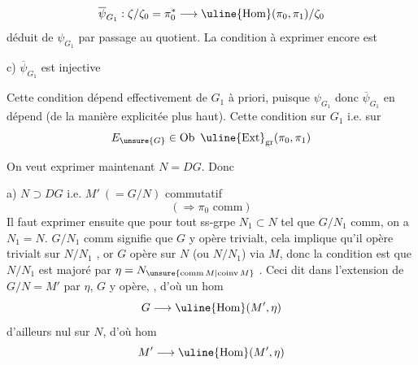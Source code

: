 \[
\overline\psi_{G_1}:\zeta/\zeta_0=\pi_0^*\longrightarrow\uline{\operatorname{Hom}}(\pi_0,\pi_1)/\zeta_0
\]
déduit de $\psi_{G_1}$ par passage au quotient.
La condition à exprimer encore est

c) $\overline\psi_{G_1}$ est injective

Cette condition dépend effectivement de
$G_1$ à priori, puisque $\psi_{G_1}$ donc $\overline\psi_{G_1}$ en
dépend (de la manière explicitée plus
haut). Cette condition sur $G_1$ i.e. sur
\[
E_{\unsure{G}}\in\operatorname{Ob}\ \uline{\operatorname{Ext}}_{\mathrm{gr}}(\pi_0,\pi_1)
\]


On veut exprimer maintenant
$N=DG$. Donc

 a) $N\supset DG$ i.e. $M'\ (=G/N)$ commutatif
\[
(\Longrightarrow\pi_0\text{ comm})
\]
Il faut exprimer ensuite que pour tout
ss-grpe  $N_1\subset N$ tel que $G/N_1$ comm, on a
$N_1=N$. $G/N_1$ comm signifie que $G$ y
opère trivialt, cela implique qu'il opère
trivialt sur $N/N_1$ , or $G$ opère sur $N$
(ou $N/N_1$) via $M$, donc la condition est que
 $N/N_1$ est majoré par $\eta=N_{\unsure{\mathrm{comm}\,M|\mathrm{coinv}\,M}}$ .
Ceci dit dans l'extension  de $G/N=M'$ par
$\eta$, $G$ y opère, , d'où un hom
\[
G\longrightarrow\uline{\operatorname{Hom}}(M',\eta)
\]
d'ailleurs nul sur $N$, d'où hom
\[
M'\longrightarrow\uline{\operatorname{Hom}}(M',\eta)
\]
